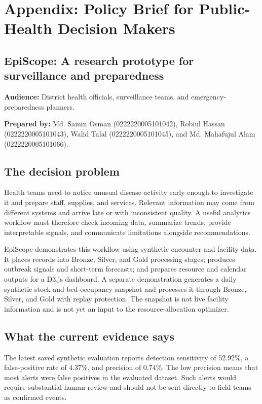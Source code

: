 \clearpage
\onecolumn
\section*{Appendix: Policy Brief for Public-Health Decision Makers}
\subsection*{EpiScope: A research prototype for surveillance and preparedness}

\noindent\textbf{Audience:} District health officials, surveillance teams, and emergency-preparedness planners.

\noindent\textbf{Prepared by:} Md. Samin Osman (0222220005101042), Robiul Hassan (0222220005101043), Walid Talal (0222220005101045), and Md. Mahafujul Alam (0222220005101066).

\subsection*{The decision problem}
Health teams need to notice unusual disease activity early enough to investigate it and prepare staff, supplies, and services. Relevant information may come from different systems and arrive late or with inconsistent quality. A useful analytics workflow must therefore check incoming data, summarize trends, provide interpretable signals, and communicate limitations alongside recommendations.

EpiScope demonstrates this workflow using synthetic encounter and facility data. It places records into Bronze, Silver, and Gold processing stages; produces outbreak signals and short-term forecasts; and prepares resource and calendar outputs for a D3.js dashboard. A separate demonstration generates a daily synthetic stock and bed-occupancy snapshot and processes it through Bronze, Silver, and Gold with replay protection. The snapshot is not live facility information and is not yet an input to the resource-allocation optimizer.

\subsection*{What the current evidence says}
The latest saved synthetic evaluation reports detection sensitivity of 52.92\%, a false-positive rate of 4.37\%, and precision of 0.74\%. The low precision means that most alerts were false positives in the evaluated dataset. Such alerts would require substantial human review and should not be sent directly to field teams as confirmed events.


